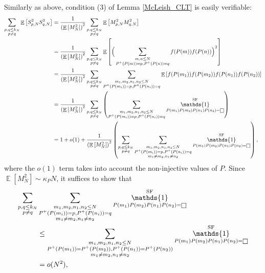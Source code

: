 \documentclass[11pts]{amsart}
\numberwithin{equation}{section}
\DeclareMathOperator{\E}{\mathbb{E}}
\DeclareMathOperator{\one}{\mathds{1}}
\let\oldsquare\square
\renewcommand{\square}[1][-1pt]{%
 {\raisebox{#1}{$\oldsquare$}}%
}
\begin{document}
Similarly as above, condition (3) of Lemma \ref{McLeish_CLT} is easily verifiable:
\begin{align*}
    \sum_{\substack{{p,q\leq k_N}\\{p\neq q}}}\E\left[S_{p,N}^2S_{q,N}^2\right]
    &=
    \frac{1}{\left(\E\left[M_N^2\right]\right)^2}\sum_{\substack{{p,q\leq k_N}\\{p\neq q}}}\E\left[M_{p,N}^2M_{q,N}^2\right]\\
    &=
    \frac{1}{\left(\E\left[M_N^2\right]\right)^2}\sum_{\substack{{p,q\leq k_N}\\{p\neq q}}}\E\left[\Big(\sum_{\substack{{m,n\leq N}\\{P^+(P(m))=p,P^+(P(n))=q}}}f(P(m))f(P(n))\Big)^2\right]\\ 
    &=
    \frac{1}{\left(\E\left[M_N^2\right]\right)^2}\sum_{\substack{{p,q\leq k_N}\\{p\neq q}}}\sum_{\substack{{m_1,m_2,n_1,n_2\leq N}\\{P^+(P(m_i))=p,P^+(P(n_i))=q}}}\E\left[f(P(m_1))f(P(m_2))f(P(n_1))f(P(n_2))\right]\\ 
    &=
    \frac{1}{\left(\E\left[M_N^2\right]\right)^2}\sum_{\substack{{p,q\leq k_N}\\{p\neq q}}}\left(\sum_{\substack{{m_1,m_2,n_1,n_2\leq N}\\{P^+(P(m_i))=p,P^+(P(n_i))=q}}}\one_{P(m_1)P(m_2)P(n_1)P(n_2)=\square}^{\text{SF}}\right)\\
    &=
    1+o(1)+\frac{1}{\left(\E\left[M_N^2\right]\right)^2}\left(
    \sum_{\substack{{p,q\leq k_N}\\{p\neq q}}}\sum_{\substack{{m_1,m_2,n_1,n_2\leq N}\\{P^+(P(m_i))=p,P^+(P(n_i))=q}\\{m_1\neq m_2,n_1\neq n_2}}}\one_{P(m_1)P(m_2)P(n_1)P(n_2)=\square}^{\text{SF}}\right),
\end{align*}
where the $o(1)$ term takes into account the non-injective values of $P$. Since $\E\left[M_N^2\right]\sim \kappa_PN$, it suffices to show that 
\begin{align*}
    \sum_{\substack{{p,q\leq k_N}\\{p\neq q}}}&\sum_{\substack{{m_1,m_2,n_1,n_2\leq N}\\{P^+(P(m_i))=p,P^+(P(n_i))=q}\\{m_1\neq m_2,n_1\neq n_2}}}\one_{P(m_1)P(m_2)P(n_1)P(n_2)=\square}^{\text{SF}}\\
    &\leq
   \sum_{\substack{{m_1,m_2,n_1,n_2\leq N}\\{P^+(P(m_1))=P^+(P(m_2)), P^+(P(n_1))=P^+(P(n_2))}\\{m_1\neq m_2,n_1\neq n_2}}}\one_{P(m_1)P(m_2)P(n_1)P(n_2)=\square}^{\text{SF}}\\
    &=
    o(N^2),
\end{align*}
\end{document}
